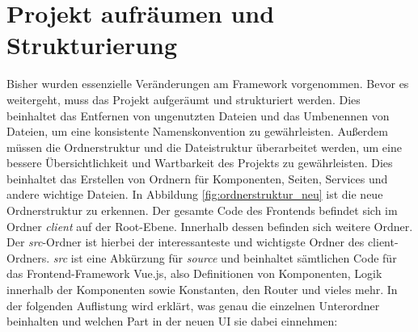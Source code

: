 


\section{Projekt aufräumen und Strukturierung}

Bisher wurden essenzielle Veränderungen am Framework vorgenommen. Bevor es weitergeht, muss das Projekt aufgeräumt und strukturiert werden. Dies beinhaltet das Entfernen von ungenutzten Dateien und das Umbenennen von Dateien, um eine konsistente Namenskonvention zu gewährleisten. Außerdem müssen die Ordnerstruktur und die Dateistruktur überarbeitet werden, um eine bessere Übersichtlichkeit und Wartbarkeit des Projekts zu gewährleisten. Dies beinhaltet das Erstellen von Ordnern für Komponenten, Seiten, Services und andere wichtige Dateien. In Abbildung \ref{fig:ordnerstruktur_neu} ist die neue Ordnerstruktur zu erkennen. Der gesamte Code des Frontends befindet sich im Ordner \textit{client} auf der Root-Ebene. Innerhalb dessen befinden sich weitere Ordner. Der \textit{src}-Ordner ist hierbei der interessanteste und wichtigste Ordner des client-Ordners. \textit{src} ist eine Abkürzung für \textit{source} und beinhaltet sämtlichen Code für das Frontend-Framework Vue.js, also Definitionen von Komponenten, Logik innerhalb der Komponenten sowie Konstanten, den Router und vieles mehr. In der folgenden Auflistung wird erklärt, was genau die einzelnen Unterordner beinhalten und welchen Part in der neuen UI sie dabei einnehmen:

